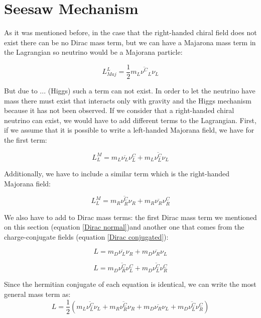 \section{Seesaw Mechanism}
As it was mentioned before, in the case that the right-handed chiral field does not exist there can be no Dirac mass term, but we can have a Majarona mass term in the Lagrangian so neutrino would be a Majorana particle:

\begin{equation}
L_{Maj}^{L} = \frac{1}{2} m_L \overline{\nu^{C}}_L \nu_L
\end{equation}

But due to ... (Higgs) such a term can not exist. In order to let the neutrino have mass there must exist that interacts only with gravity and the Higgs mechanism because it has not been observed. If we consider that a right-handed chiral neutrino can exist, we would have to add different terms to the Lagrangian. First, if we assume that it is possible to write a left-handed Majorana field, we have for the first term:

\begin{equation}
L_L^{M} = m_L \overline{\nu_L} \nu_{L}^C + m_L \overline{\nu_L^C} \nu_L
\end{equation}

Additionally, we have to include a similar term which is the right-handed Majorana field:

\begin{equation}
L_L^{M} = m_R \overline{\nu_R^C} \nu_{R} + m_R \overline{\nu_R} \nu_R^C
\end{equation}

We also have to add to Dirac mass terms: the first Dirac mass term we mentioned on this section (equation \ref{Dirac normal})and another one that comes from the charge-conjugate fields (equation \ref{Dirac conjugated}):

\begin{equation}\label{Dirac normal}
L = m_D \overline{\nu_L}\nu_R + m_D \overline{\nu_R}\nu_L
\end{equation} 

\begin{equation}\label{Dirac conjugated}
L = m_D \overline{\nu_R^C} \nu_L^C + m_D \overline{\nu_L^C}\nu_R^C
\end{equation} 

Since the hermitian conjugate of each equation is identical, we can write the most general mass term as:
\begin{equation}
L = \frac{1}{2} \left( m_L \overline{\nu_L^C} \nu_L + m_R \overline{\nu_R^C} \nu_{R} + m_D \overline{\nu_R}\nu_L + m_D \overline{\nu_L^C}\nu_R^C   \right)
\end{equation}

